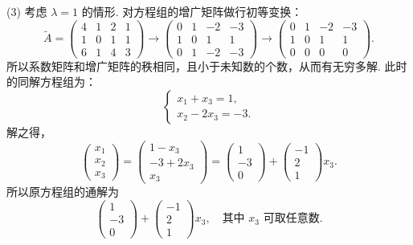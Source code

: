 \documentclass[a4paper,11pt]{ctexart}
\begin{document}
(3) 考虑 $\lambda = 1$ 的情形. 对方程组的增广矩阵做行初等变换：
\[
  \widetilde{A} = \begin{pmatrix}
    4 & 1 & 2 & 1 \\
    1 & 0 & 1 & 1 \\
    6 & 1 & 4 & 3
  \end{pmatrix}
  \longrightarrow \begin{pmatrix}
    0 & 1 & -2 & -3 \\
    1 & 0 & 1 & 1 \\
    0 & 1 & -2 & -3
  \end{pmatrix}
  \longrightarrow \begin{pmatrix}
    0 & 1 & -2 & -3 \\
    1 & 0 & 1 & 1 \\
    0 & 0 & 0 & 0
  \end{pmatrix}.
\]
所以系数矩阵和增广矩阵的秩相同，且小于未知数的个数，从而有无穷多解. 此时的同解方程组为：
\[
  \begin{cases}
    x_1 + x_3 = 1, \\
    x_2 - 2x_3 = -3.
  \end{cases}
\]
解之得，
\[
  \begin{pmatrix} x_1 \\ x_2 \\ x_3 \end{pmatrix}
  = \begin{pmatrix} 1 - x_3 \\ -3 + 2x_3 \\ x_3 \end{pmatrix}
  = \begin{pmatrix} 1 \\ -3 \\ 0 \end{pmatrix} + \begin{pmatrix} -1 \\ 2 \\ 1 \end{pmatrix} x_3.
\]
所以原方程组的通解为
\[
  \begin{pmatrix} 1 \\ -3 \\ 0 \end{pmatrix} + \begin{pmatrix} -1 \\ 2 \\ 1 \end{pmatrix} x_3,
  \quad\text{其中 } x_3 \text{ 可取任意数.}
\]

\vspace{0.6em}
\end{document}
